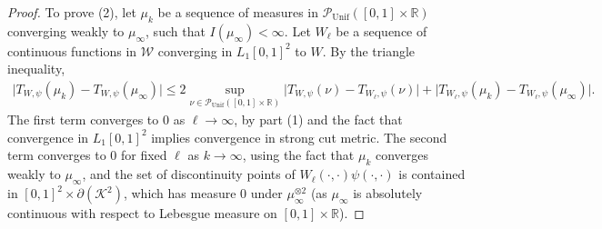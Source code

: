 \documentclass[11pt,reqno]{amsart}
\numberwithin{equation}{section}
\theoremstyle{definition}
\def\R{{\mathbb R}}
\def\P{{\mathcal P}}
\def\Punif{\P_{\mathrm{Unif}}([0,1] \times \R)}
\begin{document}
\begin{proof}
	To prove (2), let $\mu_k$ be a sequence of measures in $\Punif$ converging weakly to $\mu_\infty$, such that $I(\mu_\infty)<\infty$. Let $W_\ell$ be a sequence of continuous functions in $\mathcal{W}$ converging in $L_1[0,1]^2$ to $W$. By the triangle inequality,
	\begin{align*}
		\big|T_{W,\psi}(\mu_k)-T_{W,\psi}(\mu_\infty)\big|\le 2\sup_{\nu\in \Punif} \big|T_{W,\psi}(\nu)-T_{W_\ell,\psi}(\nu)\big|+ \big|T_{W_\ell,\psi}(\mu_k)-T_{W_\ell,\psi}(\mu_\infty)\big|.
	\end{align*}
	The first term converges to $0$ as $\ell\to\infty$, by part (1) and the fact that convergence in $ L_1[0,1]^2 $ implies convergence in  strong cut metric. The second term converges to $0$ for fixed $\ell$ as $k\to\infty$, using the fact that $\mu_k$ converges weakly to $\mu_\infty$, and the set of discontinuity points of $W_\ell(\cdot,\cdot)\psi(\cdot,\cdot)$ is contained in $[0,1]^2\times \partial(\mathcal{K}^2)$, which has measure $0$ under $\mu_\infty^{\otimes 2}$ (as $\mu_\infty$ is absolutely continuous with respect to Lebesgue measure on $[0,1]\times \R$).
\end{proof}
\end{document}
